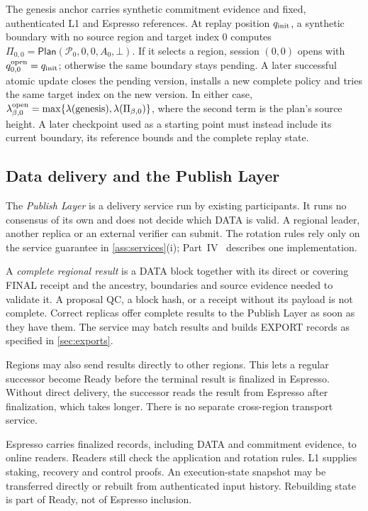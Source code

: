 \documentclass[11pt,a4paper]{article}
\newcommand{\tagg}[1]{\ensuremath{\mathsf{#1}}}
\newcommand{\defterm}[1]{\textcolor{rrBlue}{\textit{#1}}}
\begin{document}
The genesis anchor carries synthetic commitment evidence and fixed,
authenticated L1 and Espresso references. At replay position
$q_{\rm init}$, a synthetic boundary with no source region and target
index 0 computes $\Pi_{0,0}=\tagg{Plan}(\mathcal P_0,0,0,A_0,\bot)$. If it
selects a region, session $(0,0)$ opens with
$q^{\rm open}_{0,0}=q_{\rm init}$; otherwise the same boundary stays
pending. A later successful atomic update closes the pending version,
installs a new complete policy and tries the same target index on the
new version. In either case,
$\lambda^{\rm open}_{\beta,0}=\max\{\lambda(\text{genesis}),
\lambda(\Pi_{\beta,0})\}$, where the second term is the plan's source
height. A later checkpoint used as a starting point must instead include
its current boundary, its reference bounds and the complete replay state.

\subsection{Data delivery and the Publish Layer}
\label{sec:delivery}
The \defterm{Publish Layer} is a delivery service run by existing
participants. It runs no consensus of its own and does not decide which
DATA is valid. A regional leader, another replica or an external
verifier can submit. The rotation rules rely only on the service
guarantee in \cref{ass:services}(i); Part~IV~\cite{part4}
describes one implementation.

A \defterm{complete regional result} is a DATA block together with its
direct or covering FINAL receipt and the ancestry, boundaries and source
evidence needed to validate it. A proposal QC, a block hash, or a receipt
without its payload is not complete. Correct replicas offer complete
results to the Publish Layer as soon as they have them. The service may
batch results and builds EXPORT records as specified in
\cref{sec:exports}.

Regions may also send results directly to other regions. This lets a
regular successor become Ready before the terminal result is finalized
in Espresso. Without direct delivery, the successor reads the result
from Espresso after finalization, which takes longer. There is no
separate cross-region transport service.

Espresso carries finalized records, including DATA and commitment
evidence, to online readers. Readers still check the application and
rotation rules. L1 supplies staking, recovery and control proofs. An
execution-state snapshot may be transferred directly or rebuilt from
authenticated input history. Rebuilding state is part of Ready,
not of Espresso inclusion.
\end{document}

